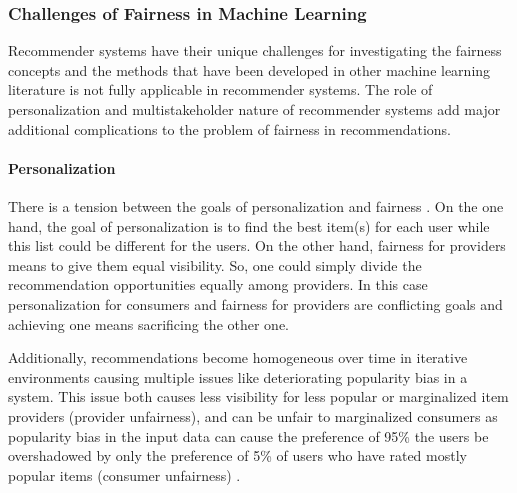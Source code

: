 \subsubsection{Challenges of Fairness in Machine Learning}
Recommender systems have their unique challenges for investigating the fairness concepts and the methods that have been developed in other machine learning literature is not fully applicable in recommender systems. The role of personalization and  multistakeholder nature of recommender systems add major additional complications to the problem of fairness in recommendations.
    
\paragraph{Personalization}
There is a tension between the goals of personalization and fairness \cite{modani2017fairness}. On the one hand, the goal of personalization is to find the best item(s) for each user while this list could be different for the users. On the other hand, fairness for providers means to give them equal visibility. So, one could simply divide the recommendation opportunities equally among providers. In this case personalization for consumers and fairness for providers are conflicting goals and achieving one means sacrificing the other one.

Additionally, recommendations become homogeneous over time in iterative environments \cite{Chaney2018} causing multiple issues like deteriorating popularity bias in a system. This issue both causes less visibility for less popular or marginalized item providers (provider unfairness), and can be unfair to marginalized consumers as popularity bias in the input data can cause the preference of 95\% the users be overshadowed by only the preference of 5\% of users who have rated mostly popular items (consumer unfairness) \cite{eskandanian2019power}.



    
